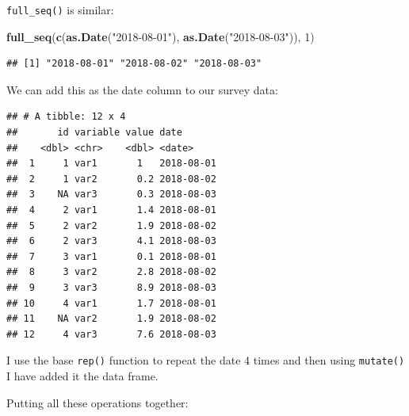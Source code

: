 \documentclass[]{gitbook}
\newenvironment{Shaded}{\begin{snugshade}}{\end{snugshade}}
\newcommand{\DataTypeTok}[1]{\textcolor[rgb]{0.13,0.29,0.53}{#1}}
\newcommand{\DecValTok}[1]{\textcolor[rgb]{0.00,0.00,0.81}{#1}}
\newcommand{\KeywordTok}[1]{\textcolor[rgb]{0.13,0.29,0.53}{\textbf{#1}}}
\newcommand{\NormalTok}[1]{#1}
\newcommand{\OperatorTok}[1]{\textcolor[rgb]{0.81,0.36,0.00}{\textbf{#1}}}
\newcommand{\StringTok}[1]{\textcolor[rgb]{0.31,0.60,0.02}{#1}}
\theoremstyle{definition}
\theoremstyle{definition}
\theoremstyle{definition}
\theoremstyle{remark}
\begin{document}
\texttt{full\_seq()} is similar:

\begin{Shaded}
\begin{Highlighting}[]
\KeywordTok{full_seq}\NormalTok{(}\KeywordTok{c}\NormalTok{(}\KeywordTok{as.Date}\NormalTok{(}\StringTok{"2018-08-01"}\NormalTok{), }\KeywordTok{as.Date}\NormalTok{(}\StringTok{"2018-08-03"}\NormalTok{)), }\DecValTok{1}\NormalTok{)}
\end{Highlighting}
\end{Shaded}

\begin{verbatim}
## [1] "2018-08-01" "2018-08-02" "2018-08-03"
\end{verbatim}

We can add this as the date column to our survey data:

\begin{Shaded}
\end{Shaded}

\begin{verbatim}
## # A tibble: 12 x 4
##       id variable value date      
##    <dbl> <chr>    <dbl> <date>    
##  1     1 var1       1   2018-08-01
##  2     1 var2       0.2 2018-08-02
##  3    NA var3       0.3 2018-08-03
##  4     2 var1       1.4 2018-08-01
##  5     2 var2       1.9 2018-08-02
##  6     2 var3       4.1 2018-08-03
##  7     3 var1       0.1 2018-08-01
##  8     3 var2       2.8 2018-08-02
##  9     3 var3       8.9 2018-08-03
## 10     4 var1       1.7 2018-08-01
## 11    NA var2       1.9 2018-08-02
## 12     4 var3       7.6 2018-08-03
\end{verbatim}

I use the base \texttt{rep()} function to repeat the date 4 times and
then using \texttt{mutate()} I have added it the data frame.

Putting all these operations together:
\end{document}
